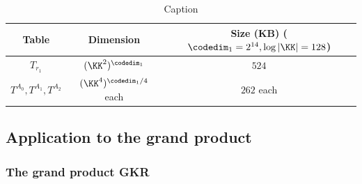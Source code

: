 \begin{table}[H]
    \centering
    \begin{tabular}{c|c|c}
        Table & Dimension & Size (KB) ($\codedim_1=2^{14}, \log|\KK|=128$)\\
        \hline
        $T_{r_1}$ & $(\KK^{2})^{\codedim_1}$ & $524$ \\
        \hline
        $T^{A_0}, T^{A_1}, T^{A_2}$ & $(\KK^{4})^{\codedim_1/4}$  each & $262$ each
    \end{tabular}
    \caption{Caption}
    \label{tab:placeholder}
\end{table}


\subsection{Application to the \ftwoz grand product}

\subsubsection{The grand product GKR}


